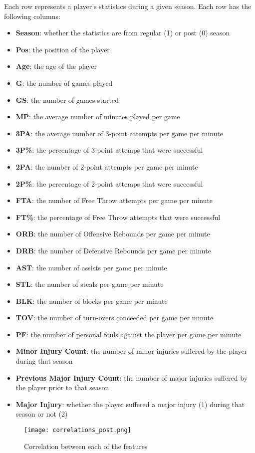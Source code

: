 \documentclass{article}
\begin{document}
\label{appendix:finaldataset}Each row represents a player's statistics during a given season. 
Each row has the following columns:
\begin{itemize}
    \item \textbf{Season}: whether the statistics are from regular (1) or post (0) season
    \item \textbf{Pos}: the position of the player
    \item \textbf{Age}: the age of the player
    \item \textbf{G}: the number of games played
    \item \textbf{GS}: the number of games started
    \item \textbf{MP}: the average number of minutes played per game
    \item \textbf{3PA}: the average number of 3-point attempts per game per minute
    \item \textbf{3P\%}: the percentage of 3-point attemps that were successful
    \item \textbf{2PA}: the number of 2-point attempts per game per minute
    \item \textbf{2P\%}: the percentage of 2-point attemps that were successful
    \item \textbf{FTA}: the number of Free Throw attempts per game per minute
    \item \textbf{FT\%}: the percentage of Free Throw attempts that were successful
    \item \textbf{ORB}: the number of Offensive Rebounds per game per minute
    \item \textbf{DRB}: the number of Defensive Rebounds per game per minute
    \item \textbf{AST}: the number of assists per game per minute
    \item \textbf{STL}: the number of steals per game per minute
    \item \textbf{BLK}: the number of blocks per game per minute
    \item \textbf{TOV}: the number of turn-overs conceeded per game per minute
    \item \textbf{PF}: the number of personal fouls against the player per game per minute
    \item \textbf{Minor Injury Count}: the number of minor injuries suffered by the player during that season
    \item \textbf{Previous Major Injury Count}: the number of major injuries suffered by the player prior to that season
    \item \textbf{Major Injury}: whether the player suffered a major injury (1) during that season or not (2)
\end{itemize}

\newpage
\begin{figure}
    \caption{\label{appendix:correlations}Correlation between each of the features}
    \centering
    \texttt{[image: correlations\_post.png]}
\end{figure}
\newpage
\end{document}
